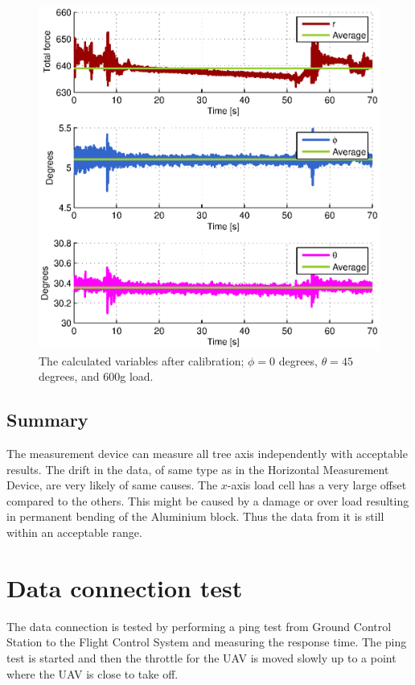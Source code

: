 \begin{figure}[hbtp]
\centering
\includegraphics[scale=1]{graphics/fcs_test/calib_result_compare_angles.eps}
\caption[The calculated variables, $\phi=0$, $\theta=45$, and 600g load.]{The calculated variables after calibration; $\phi=0$ degrees, $\theta=45$ degrees, and 600g load.}
\label{fig:calib_result_compare_angles}
\end{figure}


\newpage
\subsection{Summary}
The measurement device can measure all tree axis independently with acceptable results. The drift in the data, of same type as in the Horizontal Measurement Device, are very likely of same causes. The $x$-axis load cell has a very large offset compared to the others. This might be caused by a damage or over load resulting in permanent bending of the Aluminium block. Thus the data from it is still within  an acceptable range.



\newpage
\section{Data connection test}
The data connection is tested by performing a ping test from Ground Control Station to the Flight Control System and measuring the response time. The ping test is started and then the throttle for the UAV is moved slowly up to a point where the UAV is close to take off.


